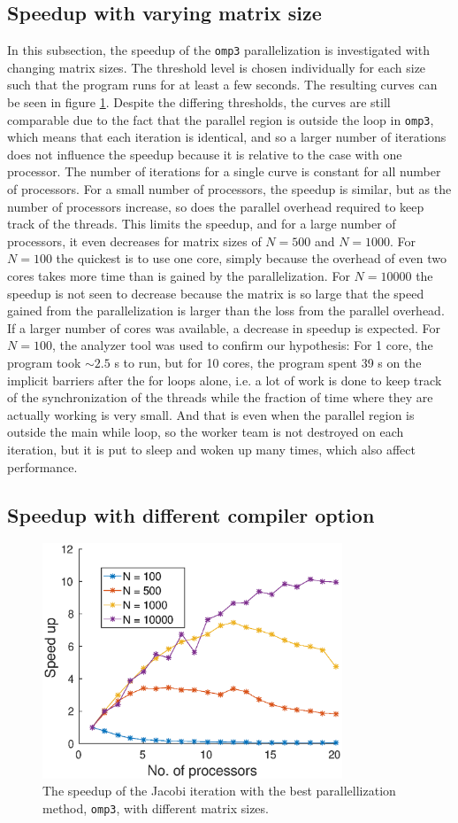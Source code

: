 \subsection{Speedup with varying matrix size}
In this subsection, the speedup of the \texttt{omp3} parallelization is investigated with changing matrix sizes. The threshold level is chosen individually for each size such that the program runs for at least a few seconds. The resulting curves can be seen in figure \ref{fig:speedup_N}. Despite the differing thresholds, the curves are still comparable due to the fact that the parallel region is outside the loop in \texttt{omp3}, which means that each iteration is identical, and so a larger number of iterations does not influence the speedup because it is relative to the case with one processor. The number of iterations for a single curve is constant for all number of processors. For a small number of processors, the speedup is similar, but as the number of processors increase, so does the parallel overhead required to keep track of the threads. This limits the speedup, and for a large number of processors, it even decreases for matrix sizes of $N = 500$ and $N = 1000$. For $N = 100$ the quickest is to use one core, simply because the overhead of even two cores takes more time than is gained by the parallelization. For $N = 10000$ the speedup is not seen to decrease because the matrix is so large that the speed gained from the parallelization is larger than the loss from the parallel overhead. If a larger number of cores was available, a decrease in speedup is expected. For $N = 100$, the analyzer tool was used to confirm our hypothesis: For 1 core, the program took $\sim 2.5$ s to run, but for 10 cores, the program spent 39 s on the implicit barriers after the for loops alone, i.e. a lot of work is done to keep track of the synchronization of the threads while the fraction of time where they are actually working is very small. And that is even when the parallel region is outside the main while loop, so the worker team is not destroyed on each iteration, but it is put to sleep and woken up many times, which also affect performance.

\subsection{Speedup with different compiler option}

\begin{figure}
\centering
\includegraphics[width = 0.8\textwidth]{fig/speedup_N.eps}
\caption{The speedup of the Jacobi iteration with the best parallellization method, \texttt{omp3}, with different matrix sizes.}
\label{fig:speedup_N}
\end{figure}
